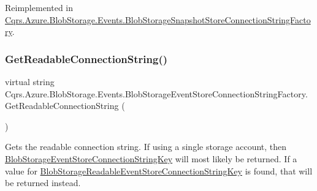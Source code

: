 Reimplemented in \hyperlink{classCqrs_1_1Azure_1_1BlobStorage_1_1Events_1_1BlobStorageSnapshotStoreConnectionStringFactory_a0b73f62d5148d477fe76d78f4171dac6_a0b73f62d5148d477fe76d78f4171dac6}{Cqrs.\+Azure.\+Blob\+Storage.\+Events.\+Blob\+Storage\+Snapshot\+Store\+Connection\+String\+Factory}.

\mbox{\label{classCqrs_1_1Azure_1_1BlobStorage_1_1Events_1_1BlobStorageEventStoreConnectionStringFactory_aa47606e4cd5a71437bed71e07fda53ed_aa47606e4cd5a71437bed71e07fda53ed}} 
\subsubsection{\texorpdfstring{Get\+Readable\+Connection\+String()}{GetReadableConnectionString()}}
{\footnotesize\ttfamily virtual string Cqrs.\+Azure.\+Blob\+Storage.\+Events.\+Blob\+Storage\+Event\+Store\+Connection\+String\+Factory.\+Get\+Readable\+Connection\+String (\begin{DoxyParamCaption}{ }\end{DoxyParamCaption})\hspace{0.3cm}{\ttfamily [virtual]}}



Gets the readable connection string. If using a single storage account, then \hyperlink{classCqrs_1_1Azure_1_1BlobStorage_1_1Events_1_1BlobStorageEventStoreConnectionStringFactory_a36edb24cf0ef60114fc344b5d0bb619d_a36edb24cf0ef60114fc344b5d0bb619d}{Blob\+Storage\+Event\+Store\+Connection\+String\+Key} will most likely be returned. If a value for \hyperlink{classCqrs_1_1Azure_1_1BlobStorage_1_1Events_1_1BlobStorageEventStoreConnectionStringFactory_a2b233edf7ad4cbc29872757006319527_a2b233edf7ad4cbc29872757006319527}{Blob\+Storage\+Readable\+Event\+Store\+Connection\+String\+Key} is found, that will be returned instead. 



